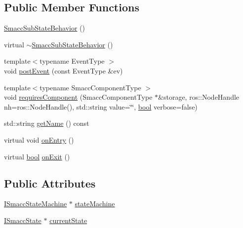 \subsection*{Public Member Functions}
\begin{DoxyCompactItemize}
\item 
\hyperlink{classsmacc_1_1SmaccSubStateBehavior_abc902f4fa003071f759a2255b276fb90}{Smacc\+Sub\+State\+Behavior} ()
\item 
virtual \hyperlink{classsmacc_1_1SmaccSubStateBehavior_a69c91bee534322bc09423d6f5b0c33a2}{$\sim$\+Smacc\+Sub\+State\+Behavior} ()
\item 
{\footnotesize template$<$typename Event\+Type $>$ }\\void \hyperlink{classsmacc_1_1SmaccSubStateBehavior_a8538664f9828247727a27446112788a2}{post\+Event} (const Event\+Type \&ev)
\item 
{\footnotesize template$<$typename Smacc\+Component\+Type $>$ }\\void \hyperlink{classsmacc_1_1SmaccSubStateBehavior_a4d25c4ba8ec01c489df172a71bb1c37d}{requires\+Component} (Smacc\+Component\+Type $\ast$\&storage, ros\+::\+Node\+Handle nh=ros\+::\+Node\+Handle(), std\+::string value=\char`\"{}\char`\"{}, \hyperlink{classbool}{bool} verbose=false)
\item 
std\+::string \hyperlink{classsmacc_1_1SmaccSubStateBehavior_a077a9784d17e3a95284ad351a43cfcbb}{get\+Name} () const 
\item 
virtual void \hyperlink{classsmacc_1_1SmaccSubStateBehavior_a7c28e1c46238bbb2c2e0450573c6de94}{on\+Entry} ()
\item 
virtual \hyperlink{classbool}{bool} \hyperlink{classsmacc_1_1SmaccSubStateBehavior_ab78b9de76c04a7ab6c16d5924e216ef9}{on\+Exit} ()
\end{DoxyCompactItemize}
\subsection*{Public Attributes}
\begin{DoxyCompactItemize}
\item 
\hyperlink{classsmacc_1_1ISmaccStateMachine}{I\+Smacc\+State\+Machine} $\ast$ \hyperlink{classsmacc_1_1SmaccSubStateBehavior_ae3ff8a316bdd4bc5b7fee59d19464609}{state\+Machine}
\item 
\hyperlink{classsmacc_1_1ISmaccState}{I\+Smacc\+State} $\ast$ \hyperlink{classsmacc_1_1SmaccSubStateBehavior_a62e2b9da4a446f09396d0b4c01659b88}{current\+State}
\end{DoxyCompactItemize}


